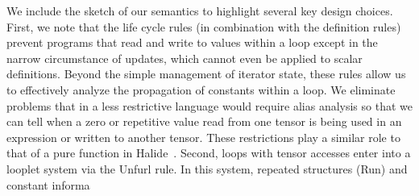 We include the sketch of our semantics to highlight several key design choices.
%
First, we note that the life cycle rules (in combination with the definition rules) prevent programs that read and write to values within a loop except in the narrow circumstance of updates, which cannot even be applied to scalar definitions.
%
Beyond the simple management of iterator state, these rules allow us to effectively analyze the propagation of constants within a loop.
%
We eliminate problems that in a less restrictive language would require alias analysis so that we can tell when a zero or repetitive value read from one tensor is being used in an expression or written to another tensor.
%
These restrictions play a similar role to that of a pure function in Halide~\cite{ragan-kelley_halide_2013}.
%
Second, loops with tensor accesses enter into a looplet system via the Unfurl rule.
%
In this system, repeated structures  (Run) and constant informa




